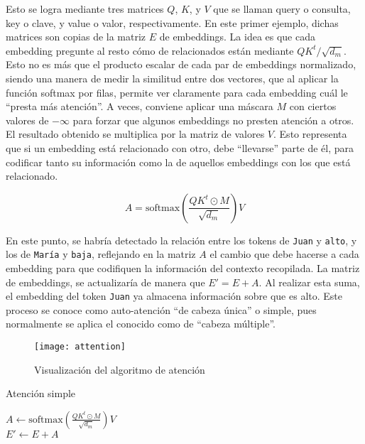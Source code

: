 				Esto se logra mediante tres matrices $Q$, $K$, y $V$ que se llaman query o consulta, key o clave, y value o valor, respectivamente. En este primer ejemplo, dichas matrices son copias de la matriz $E$ de embeddings. La idea es que cada embedding pregunte al resto cómo de relacionados están mediante $QK^t/\sqrt{d_m}$. Esto no es más que el producto escalar de cada par de embeddings normalizado, siendo una manera de medir la similitud entre dos vectores, que al aplicar la función softmax por filas, permite ver claramente para cada embedding cuál le ``presta más atención''. A veces, conviene aplicar una máscara $M$ con ciertos valores de $-\infty$ para forzar que algunos embeddings no presten atención a otros. El resultado obtenido se multiplica por la matriz de valores $V$. Esto representa que si un embedding está relacionado con otro, debe ``llevarse'' parte de él, para codificar tanto su información como la de aquellos embeddings con los que está relacionado. 
				
				$$
				A = \text{softmax}\left(\frac{QK^t\odot M}{\sqrt{d_m}}\right)V
				$$
				
				En este punto, se habría detectado la relación entre los tokens de \texttt{Juan} y \texttt{alto}, y los de \texttt{María} y \texttt{baja}, reflejando en la matriz $A$ el cambio que debe hacerse a cada embedding para que codifiquen la información del contexto recopilada. La matriz de embeddings, se actualizaría de manera que $E' = E + A$. Al realizar esta suma, el embedding del token \texttt{Juan} ya almacena información sobre que es alto. Este proceso se conoce como auto-atención ``de cabeza única'' o simple, pues normalmente se aplica el conocido como de ``cabeza múltiple''. \\
				
				\begin{figure}[!h]
					\centering
					\texttt{[image: attention]}
					\caption{Visualización del algoritmo de atención}
					\label{fig:attention}
				\end{figure}
				
				\begin{algorithm}
					\DontPrintSemicolon
					
					\caption{Atención simple}
					\label{algo:attention_simple}
					
					
					$A \gets \text{softmax}\left(\frac{QK^t\odot M}{\sqrt{d_m}}\right)V$\\
					$E' \gets E + A$
				\end{algorithm}
				
